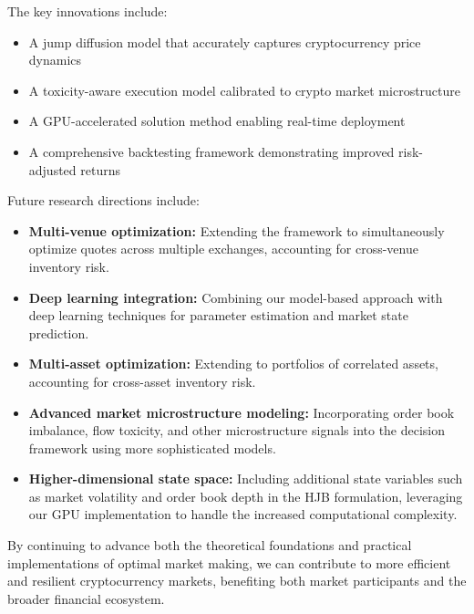 \documentclass[twocolumn,11pt]{IEEEtran}  %
\begin{document}
\begin{onecolumn}
\begin{twocolumn}
The key innovations include:
\begin{itemize}
    \item A jump diffusion model that accurately captures cryptocurrency price dynamics
    \item A toxicity-aware execution model calibrated to crypto market microstructure
    \item A GPU-accelerated solution method enabling real-time deployment
    \item A comprehensive backtesting framework demonstrating improved risk-adjusted returns
\end{itemize}

Future research directions include:

\begin{itemize}
    \item \textbf{Multi-venue optimization:} Extending the framework to simultaneously optimize quotes across multiple exchanges, accounting for cross-venue inventory risk.
    
    \item \textbf{Deep learning integration:} Combining our model-based approach with deep learning techniques for parameter estimation and market state prediction.
    
    \item \textbf{Multi-asset optimization:} Extending to portfolios of correlated assets, accounting for cross-asset inventory risk.
    
    \item \textbf{Advanced market microstructure modeling:} Incorporating order book imbalance, flow toxicity, and other microstructure signals into the decision framework using more sophisticated models.
    
    \item \textbf{Higher-dimensional state space:} Including additional state variables such as market volatility and order book depth in the HJB formulation, leveraging our GPU implementation to handle the increased computational complexity.
\end{itemize}

By continuing to advance both the theoretical foundations and practical implementations of optimal market making, we can contribute to more efficient and resilient cryptocurrency markets, benefiting both market participants and the broader financial ecosystem.

\begin{thebibliography}{99}


\end{thebibliography}
\end{twocolumn}
\end{onecolumn}
\end{document}
